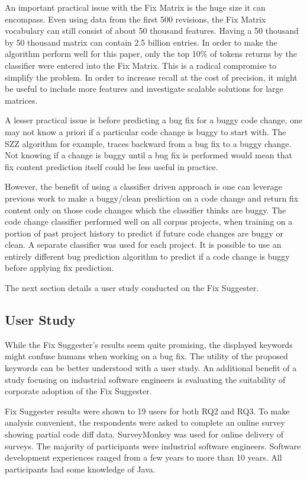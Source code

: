 \documentclass[conference]{IEEEtran}
\begin{document}
An important practical issue with the Fix Matrix is the huge size it can encompass. Even using data from the first 500 revisions, the Fix Matrix vocabulary can still consist of about 50 thousand features. Having a 50 thousand by 50 thousand matrix can contain 2.5 billion
entries. In order to make the algorithm perform well for this paper, only the top 10\% of tokens returns by the classifier were entered into the Fix Matrix. This is a radical compromise to simplify the problem. In order to increase recall at the cost of precision, it might
be useful to include more features and investigate scalable solutions for large matrices.

A lesser practical issue is before predicting a bug fix for a buggy code change, one may not know a priori if a particular code change is buggy to start with.
The SZZ algorithm for example, traces backward from a bug fix to a buggy change.
Not knowing if a change is buggy until a bug fix is performed would mean that fix content prediction itself could be less useful in practice.

However, the benefit of using a classifier driven approach is one can leverage previous work to make a buggy/clean prediction on a code change and return fix content
 only on those code changes which the classifier thinks are buggy.
The code change classifier performed well on all corpus projects, when training on a portion of past project history to predict if future code changes are buggy or clean. 
A separate classifier was used for each project.
It is possible to use an entirely different bug prediction algorithm to predict if a code change is buggy before applying fix prediction.

The next section details a user study conducted on the Fix Suggester.

\subsection{User Study}

While the Fix Suggester's results seem quite promising, the displayed keywords might confuse humans when working on a bug fix. The utility of the proposed keywords can be better understood with a user study. An additional benefit of a study focusing on industrial software engineers is evaluating the suitability of corporate adoption of the Fix Suggester.

Fix Suggester results were shown to 19 users for both RQ2 and RQ3. To make analysis convenient, the respondents were asked to complete an online survey showing partial code diff data. SurveyMonkey was used for online delivery of surveys. The majority of participants were industrial software engineers. Software development experiences ranged from a few years to more than 10 years. All participants had some knowledge of Java.
\end{document}
